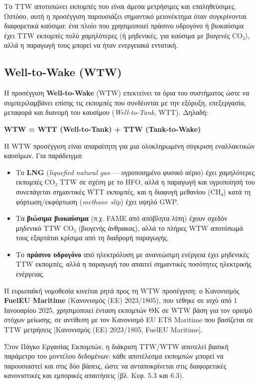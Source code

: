 \documentclass[11pt,a4paper,greek,twoside]{template-xe}
\providecommand{\tightlist}{\setlength{\itemsep}{0pt}\setlength{\parskip}{0pt}}
\begin{document}
Το TTW αποτυπώνει εκπομπές που είναι άμεσα μετρήσιμες και επαληθεύσιμες.
Ωστόσο, αυτή η προσέγγιση παρουσιάζει σημαντικό μειονέκτημα όταν
συγκρίνονται διαφορετικά καύσιμα: ένα πλοίο που χρησιμοποιεί πράσινο
υδρογόνο ή βιοκαύσιμα έχει TTW εκπομπές πολύ χαμηλότερες (ή μηδενικές,
για καύσιμα με βιογενές CO₂), αλλά η παραγωγή τους μπορεί να ήταν
ενεργειακά εντατική.

\subsection{Well-to-Wake (WTW)}\label{well-to-wake-wtw}

Η προσέγγιση \textbf{Well-to-Wake} (WTW) επεκτείνει τα όρια του
συστήματος ώστε να συμπεριλαμβάνει επίσης τις εκπομπές που συνδέονται με
την εξόρυξη, επεξεργασία, μεταφορά και διανομή του καυσίμου
(\emph{Well-to-Tank}, WTT). Δηλαδή:

\textbf{WTW = WTT (Well-to-Tank) + TTW (Tank-to-Wake)}

Η WTW προσέγγιση είναι απαραίτητη για μια ολοκληρωμένη σύγκριση
εναλλακτικών καυσίμων. Για παράδειγμα:

\begin{itemize}
\tightlist
\item
  Το \textbf{LNG} (\emph{liquefied natural gas} --- υγροποιημένο φυσικό
  αέριο) έχει χαμηλότερες εκπομπές CO₂ TTW σε σχέση με το HFO, αλλά η
  παραγωγή και υγροποίησή του συνεπάγεται σημαντικές WTT εκπομπές, και η
  διαφυγή μεθανίου (CH₄) κατά τη φόρτωση/εκφόρτωση (\emph{methane slip})
  έχει υψηλό GWP.
\item
  Τα \textbf{βιώσιμα βιοκαύσιμα} (π.χ. FAME από απόβλητα λίπη) έχουν
  σχεδόν μηδενικό TTW CO₂ (βιογενής άνθρακας), αλλά το πλήρες WTW
  αποτύπωμά τους εξαρτάται κρίσιμα από τη διαδρομή παραγωγής.
\item
  Το \textbf{πράσινο υδρογόνο} από ηλεκτρόλυση με ανανεώσιμη ενέργεια
  έχει μηδενικές TTW εκπομπές, αλλά η παραγωγή του απαιτεί σημαντικές
  ποσότητες ηλεκτρικής ενέργειας.
\end{itemize}

Η ευρωπαϊκή νομοθεσία κινείται ρητά προς τη WTW προσέγγιση: ο Κανονισμός
\textbf{FuelEU Maritime} (Κανονισμός (ΕΕ) 2023/1805), που τέθηκε σε ισχύ
από 1 Ιανουαρίου 2025, χρησιμοποιεί ένταση εκπομπών ΘΚ σε WTW βάση για
τον ορισμό στόχων μείωσης, σε αντίθεση με τον Κανονισμό EU ETS Maritime
που βασίζεται σε TTW μετρήσεις {[}Κανονισμός (ΕΕ) 2023/1805, FuelEU
Maritime{]}.

Στον Πάγκο Εργασίας Εκπομπών, η διάκριση TTW/WTW αποτελεί βασική
παράμετρο του μοντέλου δεδομένων: κάθε αποτέλεσμα εκπομπών μπορεί να
παρουσιαστεί και στις δύο βάσεις, ώστε να ανταποκρίνεται στις
διαφορετικές κανονιστικές και εμπορικές απαιτήσεις (βλ. Κεφ. 5.3 και
6.3).
\end{document}
